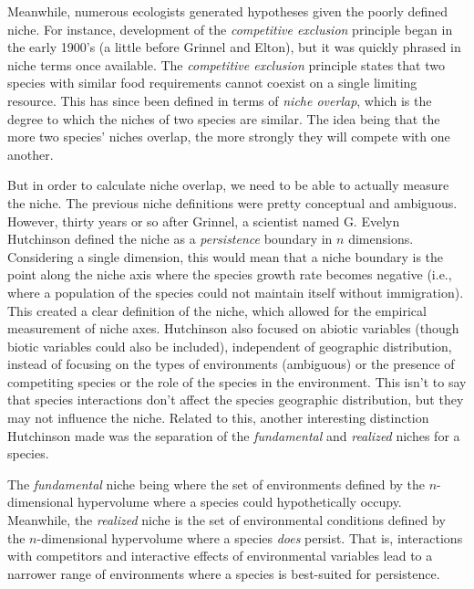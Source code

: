 \documentclass[12pt]{article}
\begin{document}
Meanwhile, numerous ecologists generated hypotheses given the poorly defined niche. For instance, development of the \textit{competitive exclusion} principle began in the early 1900's (a little before Grinnel and Elton), but it was quickly phrased in niche terms once available. The \textit{competitive exclusion} principle states that two species with similar food requirements cannot coexist on a single limiting resource. This has since been defined in terms of \textit{niche overlap}, which is the degree to which the niches of two species are similar. The idea being that the more two species' niches overlap, the more strongly they will compete with one another. 


But in order to calculate niche overlap, we need to be able to actually measure the niche. The previous niche definitions were pretty conceptual and ambiguous. However, thirty years or so after Grinnel, a scientist named G. Evelyn Hutchinson defined the niche as a \textit{persistence} boundary in $n$ dimensions. Considering a single dimension, this would mean that a niche boundary is the point along the niche axis where the species growth rate becomes negative (i.e., where a population of the species could not maintain itself without immigration). This created a clear definition of the niche, which allowed for the empirical measurement of niche axes. Hutchinson also focused on abiotic variables (though biotic variables could also be included), independent of geographic distribution, instead of focusing on the types of environments (ambiguous) or the presence of competiting species or the role of the species in the environment. This isn't to say that species interactions don't affect the species geographic distribution, but they may not influence the niche. Related to this, another interesting distinction Hutchinson made was the separation of the \textit{fundamental} and \textit{realized} niches for a species. 



The \textit{fundamental} niche being where the set of environments defined by the $n$-dimensional hypervolume where a species could hypothetically occupy. Meanwhile, the \textit{realized} niche is the set of environmental conditions defined by the $n$-dimensional hypervolume where a species \textit{does} persist. That is, interactions with competitors and interactive effects of environmental variables lead to a narrower range of environments where a species is best-suited for persistence. 
\end{document}

